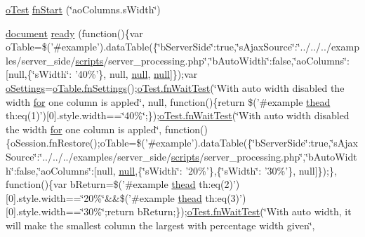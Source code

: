 \begin{DoxyCompactItemize}
\item 
\hyperlink{unit__test_8js_a3b2d259e2df3b6860d9047a92d09d0d6}{o\+Test} \hyperlink{4__server-side_2ao_columns_8s_width_8js_a6e6c822055fc4504b3b61b7dd1775998}{fn\+Start} (\char`\"{}ao\+Columns.\+s\+Width\char`\"{})
\item 
\hyperlink{outside_events_8js_aa14f8e0338cced6720590fd2ea13bd4b}{document} \hyperlink{4__server-side_2ao_columns_8s_width_8js_a54ef478ae62e5cc3a1e6d7caf1ddf8cf}{ready} (function()\{var o\+Table=\$('\#example').data\+Table(\{\char`\"{}b\+Server\+Side\char`\"{}\+:true,\char`\"{}s\+Ajax\+Source\char`\"{}\+:\char`\"{}../../../examples/server\+\_\+side/\hyperlink{tinymce_8jquery_8dev_8js_a09066d4d580eeec222f858d588b4cdef}{scripts}/server\+\_\+processing.\+php\char`\"{},\char`\"{}b\+Auto\+Width\char`\"{}\+:false,\char`\"{}ao\+Columns\char`\"{}\+:\mbox{[}null,\{\char`\"{}s\+Width\char`\"{}\+: '40\%'\}, null, \hyperlink{validate_8js_afb8e110345c45e74478894341ab6b28e}{null}, \hyperlink{validate_8js_afb8e110345c45e74478894341ab6b28e}{null}\mbox{]}\});var \hyperlink{model_8settings_8js_a4857b9c813b4dea010668e9555d0aca7}{o\+Settings}=\hyperlink{api_8methods_8js_a78f387fab92a85c2cb7830bc5d8a6141}{o\+Table.\+fn\+Settings}();\hyperlink{onhold_24__server-side_2__zero__config_8js_ab25c4d596771c0133cdc45178ce72c3d}{o\+Test.\+fn\+Wait\+Test}(\char`\"{}With auto width disabled the width \hyperlink{tinymce_8jquery_8dev_8js_a4675a875b20881bc5f7011f49fbd4da7}{for} one column is appled\char`\"{}, null, function()\{return \$('\#example \hyperlink{core_8constructor_8js_a856be760b6816c9591ce69f0a2b43693}{thead} th\+:eq(1)')\mbox{[}0\mbox{]}.style.\+width==\char`\"{}40\%\char`\"{};\});\hyperlink{onhold_24__server-side_2__zero__config_8js_ab25c4d596771c0133cdc45178ce72c3d}{o\+Test.\+fn\+Wait\+Test}(\char`\"{}With auto width disabled the width \hyperlink{tinymce_8jquery_8dev_8js_a4675a875b20881bc5f7011f49fbd4da7}{for} one column is appled\char`\"{}, function()\{o\+Session.\+fn\+Restore();o\+Table=\$('\#example').data\+Table(\{\char`\"{}b\+Server\+Side\char`\"{}\+:true,\char`\"{}s\+Ajax\+Source\char`\"{}\+:\char`\"{}../../../examples/server\+\_\+side/\hyperlink{tinymce_8jquery_8dev_8js_a09066d4d580eeec222f858d588b4cdef}{scripts}/server\+\_\+processing.\+php\char`\"{},\char`\"{}b\+Auto\+Width\char`\"{}\+:false,\char`\"{}ao\+Columns\char`\"{}\+:\mbox{[}null, \hyperlink{validate_8js_afb8e110345c45e74478894341ab6b28e}{null},\{\char`\"{}s\+Width\char`\"{}\+: '20\%'\},\{\char`\"{}s\+Width\char`\"{}\+: '30\%'\}, null\mbox{]}\});\}, function()\{var b\+Return=\$('\#example \hyperlink{core_8constructor_8js_a856be760b6816c9591ce69f0a2b43693}{thead} th\+:eq(2)')\mbox{[}0\mbox{]}.style.\+width==\char`\"{}20\%\char`\"{}\&\&\$('\#example \hyperlink{core_8constructor_8js_a856be760b6816c9591ce69f0a2b43693}{thead} th\+:eq(3)')\mbox{[}0\mbox{]}.style.\+width==\char`\"{}30\%\char`\"{};return b\+Return;\});\hyperlink{onhold_24__server-side_2__zero__config_8js_ab25c4d596771c0133cdc45178ce72c3d}{o\+Test.\+fn\+Wait\+Test}(\char`\"{}With auto width, it will make the smallest column the largest with percentage width given\char`\"{}, 
\end{DoxyCompactItemize}
